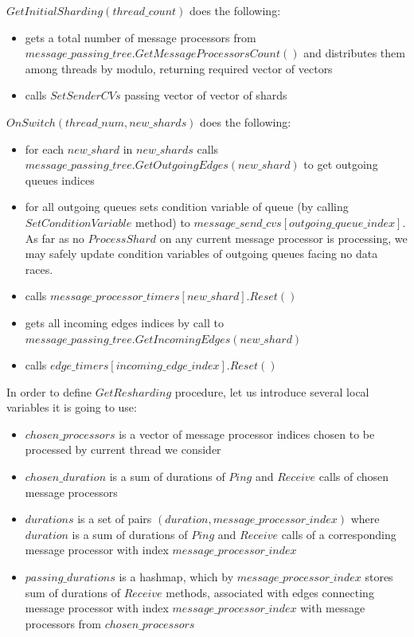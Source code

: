 \documentclass{article}
\begin{document}
$GetInitialSharding(thread\_count)$ does the following:
\begin{itemize}
	\item gets a total number of message processors from \\
		$message\_passing\_tree.GetMessageProcessorsCount()$ and distributes them among threads by modulo, returning required vector of vectors
	\item calls $SetSenderCVs$ passing vector of vector of shards
\end{itemize}

$OnSwitch(thread\_num, new\_shards)$ does the following:
\begin{itemize}
	\item for each $new\_shard$ in $new\_shards$ calls \\
		$message\_passing\_tree.GetOutgoingEdges(new\_shard)$ to get outgoing queues indices
	\item for all outgoing queues sets condition variable of queue (by calling $SetConditionVariable$ method) to $message\_send\_cvs[outgoing\_queue\_index]$. As far as no $ProcessShard$ on any current message processor is processing, we may safely update condition variables of outgoing queues facing no data races.
	\item calls $message\_processor\_timers[new\_shard].Reset()$
	\item gets all incoming edges indices by call to \\
		$message\_passing\_tree.GetIncomingEdges(new\_shard)$
	\item calls  $edge\_timers[incoming\_edge\_index].Reset()$
\end{itemize}

In order to define $GetResharding$ procedure, let us introduce several local variables it is going to use:
\begin{itemize}
	\item $chosen\_processors$ is a vector of message processor indices chosen to be processed by current thread we consider
	\item $chosen\_duration$ is a sum of durations of $Ping$ and $Receive$ calls of chosen message processors
	\item $durations$ is a set of pairs $(duration, message\_processor\_index)$ where $duration$ is a sum of durations of $Ping$ and $Receive$ calls of a corresponding message processor with index $message\_processor\_index$
	\item $passing\_durations$ is a hashmap, which by $message\_processor\_index$ stores sum of durations of $Receive$ methods, associated with edges connecting message processor with index $message\_processor\_index$ with message processors from $chosen\_processors$
\end{itemize}
\end{document}
